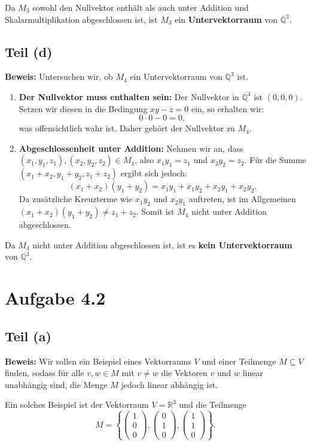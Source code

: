 \documentclass[11pt]{article}
\begin{document}
Da \( M_3 \) sowohl den Nullvektor enthält als auch unter Addition und Skalarmultiplikation abgeschlossen ist, ist \( M_3 \) ein \textbf{Untervektorraum} von \( \mathbb{Q}^3 \).

\subsection*{Teil (d)}

\textbf{Beweis:} Untersuchen wir, ob \( M_4 \) ein Untervektorraum von \( \mathbb{Q}^3 \) ist.

\begin{enumerate}
    \item \textbf{Der Nullvektor muss enthalten sein:} Der Nullvektor in \( \mathbb{Q}^3 \) ist \((0, 0, 0)\). Setzen wir diesen in die Bedingung \(xy - z = 0\) ein, so erhalten wir:
   \[
   0 \cdot 0 - 0 = 0,
   \]
   was offensichtlich wahr ist. Daher gehört der Nullvektor zu \( M_4 \).

    \item \textbf{Abgeschlossenheit unter Addition:} Nehmen wir an, dass \( (x_1, y_1, z_1), (x_2, y_2, z_2) \in M_4 \), also \( x_1 y_1 = z_1 \) und \( x_2 y_2 = z_2 \). Für die Summe \((x_1 + x_2, y_1 + y_2, z_1 + z_2)\) ergibt sich jedoch:
   \[
   (x_1 + x_2)(y_1 + y_2) = x_1 y_1 + x_1 y_2 + x_2 y_1 + x_2 y_2.
   \]
   Da zusätzliche Kreuzterme wie \( x_1 y_2 \) und \( x_2 y_1 \) auftreten, ist im Allgemeinen \((x_1 + x_2)(y_1 + y_2) \neq z_1 + z_2\). Somit ist \( M_4 \) nicht unter Addition abgeschlossen.
\end{enumerate}

Da \( M_4 \) nicht unter Addition abgeschlossen ist, ist es \textbf{kein Untervektorraum} von \( \mathbb{Q}^3 \).

\section*{Aufgabe 4.2}

\subsection*{Teil (a)}

\textbf{Beweis:} Wir sollen ein Beispiel eines Vektorraums \( V \) und einer Teilmenge \( M \subseteq V \) finden, sodass für alle \( v, w \in M \) mit \( v \neq w \) die Vektoren \( v \) und \( w \) linear unabhängig sind, die Menge \( M \) jedoch linear abhängig ist.

Ein solches Beispiel ist der Vektorraum \( V = \mathbb{R}^3 \) und die Teilmenge
\[
M = \left\{ \begin{pmatrix} 1 \\ 0 \\ 0 \end{pmatrix}, \begin{pmatrix} 0 \\ 1 \\ 0 \end{pmatrix}, \begin{pmatrix} 1 \\ 1 \\ 0 \end{pmatrix} \right\}.
\]
\end{document}
